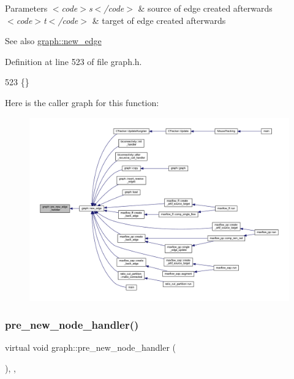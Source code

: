 \begin{DoxyParams}{Parameters}
{\em $<$code$>$s$<$/code$>$} & source of edge created afterwards \\
\hline
{\em $<$code$>$t$<$/code$>$} & target of edge created afterwards \\
\hline
\end{DoxyParams}
\begin{DoxySeeAlso}{See also}
\mbox{\hyperlink{classgraph_a02a0c3a219f75d68caa408ef339d4a1c}{graph\+::new\+\_\+edge}} 
\end{DoxySeeAlso}


Definition at line 523 of file graph.\+h.


\begin{DoxyCode}
523 \{\}    
\end{DoxyCode}
Here is the caller graph for this function\+:
\nopagebreak
\begin{figure}[H]
\begin{center}
\leavevmode
\includegraphics[width=350pt]{classgraph_a0a7a68fa0baa47ef955525c445fa1a04_icgraph}
\end{center}
\end{figure}
\mbox{\label{classgraph_afb7606eaa8d673b6599af24437c0546c}} 
\subsubsection{\texorpdfstring{pre\+\_\+new\+\_\+node\+\_\+handler()}{pre\_new\_node\_handler()}}
{\footnotesize\ttfamily virtual void graph\+::pre\+\_\+new\+\_\+node\+\_\+handler (\begin{DoxyParamCaption}{ }\end{DoxyParamCaption})\hspace{0.3cm}{\ttfamily [inline]}, {\ttfamily [virtual]}, {\ttfamily [inherited]}}

